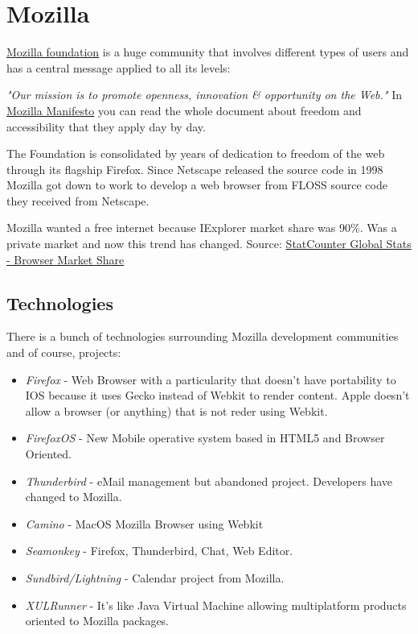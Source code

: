 \section{Mozilla}
\label{sec:mozilla}

\par \href{http://www.mozilla.org/}{Mozilla foundation} is a huge community that involves different types of users and has a central message applied to all its levels:

\par \textit{"Our mission is to promote openness, innovation \& opportunity on the Web."} In \href{http://www.mozilla.org/about/manifesto.html}{Mozilla Manifesto} you can read the whole document about freedom and accessibility that they apply day by day.

\par The Foundation is consolidated by years of dedication to freedom of the web through its flagship Firefox. Since Netscape released the source code in 1998 Mozilla got down to work to develop a web browser from FLOSS source code they received from Netscape.

\par Mozilla wanted a free internet because IExplorer market share was 90\%. Was a private market and now this trend has changed. Source: \href{http://gs.statcounter.com/#browser-ww-yearly-2008-2013}{StatCounter Global Stats - Browser Market Share}

\subsection{Technologies}

\par There is a bunch of technologies surrounding Mozilla development communities and of course, projects:

\begin{itemize}
	\item \textit{Firefox} - Web Browser with a particularity that doesn't have portability to IOS because it uses Gecko instead of Webkit to render content. Apple doesn't allow a browser (or anything) that is not reder using Webkit.
	\item \textit{FirefoxOS} - New Mobile operative system based in HTML5 and Browser Oriented.
	\item \textit{Thunderbird} - eMail management but abandoned project. Developers have changed to Mozilla.
	\item \textit{Camino} - MacOS Mozilla Browser using Webkit
	\item \textit{Seamonkey} - Firefox, Thunderbird, Chat, Web Editor.
	\item \textit{Sundbird/Lightning} - Calendar project from Mozilla.
	\item \textit{XULRunner} - It's like Java Virtual Machine allowing multiplatform products oriented to Mozilla packages.
\end{itemize}

